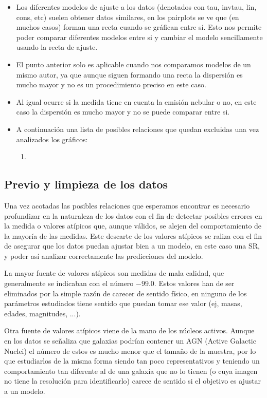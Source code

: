 \documentclass[11pt, a4paper]{article} %
\begin{document}
\begin{itemize}
    \item Los diferentes modelos de ajuste a los datos (denotados con tau, invtau, lin, cons, etc) 
    suelen obtener datos similares, en los pairplots se ve que (en muchos casos) forman una recta cuando se gráfican entre sí. Esto nos permite poder comparar diferentes modelos entre si y cambiar el modelo sencillamente usando la recta de ajuste.
    \item El punto anterior solo es aplicable cuando nos comparamos modelos de un mismo autor, ya que aunque siguen formando una recta la dispersión es mucho mayor y no es un procedimiento preciso en este caso.
    \item Al igual ocurre si la medida tiene en cuenta la emisión nebular o no, en este caso la dispersión es mucho mayor y no se puede comparar entre si.
    \item A continuación una lista de posibles relaciones que quedan excluidas una vez analizados los gráficos:
    \begin{enumerate}
        \item 
    \end{enumerate}
\end{itemize}



\subsection{Previo y limpieza de los datos}

Una vez acotadas las posibles relaciones que esperamos encontrar es necesario profundizar en la naturaleza de los datos con 
el fin de detectar posibles errores en la medida o valores atípicos que, aunque válidos, se alejen del comportamiento de la mayoría de las medidas. 
Este descarte de los valores atípicos se raliza con el fin de asegurar que los datos puedan ajustar bien a un modelo, en este caso una SR, y poder así analizar 
correctamente las predicciones del modelo. 

La mayor fuente de valores atípicos son medidas de mala calidad, que generalmente se indicaban con el número $-99.0$. Estos valores han de ser eliminados por la simple razón de carecer de sentido físico, en ninguno de los parámetros estudiados tiene sentido que puedan tomar ese valor (ej, masas, edades, magnitudes, ...). 

Otra fuente de valores atípicos viene de la mano de los núcleos activos. Aunque en los datos se señaliza que galaxias podrían contener un AGN (Active Galactic Nuclei) el número de estos es mucho menor que el tamaño de la muestra, por lo que estudiarlos
de la misma forma siendo tan poco representativos y teniendo un comportamiento tan diferente al de una galaxía que no lo tienen (o cuya imagen no tiene la resolución para identificarlo) carece de sentido si el objetivo es ajustar a un modelo. 
\end{document}
